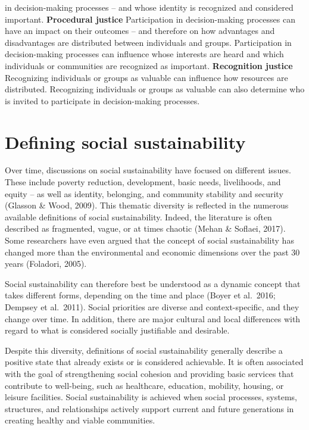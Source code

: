 \documentclass[
  a4paper,
  openany]{book}
\begin{document}
in decision-making processes -- and whose identity is recognized and
considered important. \textbar{} \textbar{} \textbf{Procedural justice}
\textbar{} Participation in decision-making processes can have an impact
on their outcomes -- and therefore on how advantages and disadvantages
are distributed between individuals and groups. \textbar{} \textbar{}
Participation in decision-making processes can influence whose interests
are heard and which individuals or communities are recognized as
important. \textbar{} \textbar{} \textbf{Recognition justice} \textbar{}
Recognizing individuals or groups as valuable can influence how
resources are distributed. \textbar{} Recognizing individuals or groups
as valuable can also determine who is invited to participate in
decision-making processes. \textbar{} \textbar{}

\section{Defining social
sustainability}\label{defining-social-sustainability}

Over time, discussions on social sustainability have focused on
different issues. These include poverty reduction, development, basic
needs, livelihoods, and equity -- as well as identity, belonging, and
community stability and security (Glasson \& Wood, 2009). This thematic
diversity is reflected in the numerous available definitions of social
sustainability. Indeed, the literature is often described as fragmented,
vague, or at times chaotic (Mehan \& Soflaei, 2017). Some researchers
have even argued that the concept of social sustainability has changed
more than the environmental and economic dimensions over the past 30
years (Foladori, 2005).

Social sustainability can therefore best be understood as a dynamic
concept that takes different forms, depending on the time and place
(Boyer et al.~2016; Dempsey et al.~2011). Social priorities are diverse
and context-specific, and they change over time. In addition, there are
major cultural and local differences with regard to what is considered
socially justifiable and desirable.

Despite this diversity, definitions of social sustainability generally
describe a positive state that already exists or is considered
achievable. It is often associated with the goal of strengthening social
cohesion and providing basic services that contribute to well-being,
such as healthcare, education, mobility, housing, or leisure facilities.
Social sustainability is achieved when social processes, systems,
structures, and relationships actively support current and future
generations in creating healthy and viable communities.
\end{document}
